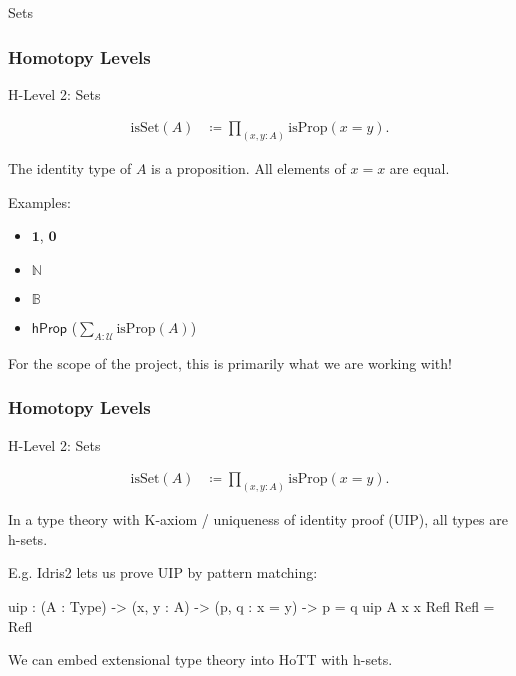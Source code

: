 \documentclass[9pt]{beamer}
\begin{document}
\begin{frame}{Sets}
\frametitle{Homotopy Levels}

H-Level 2: Sets

\begin{align*}
  \text{isSet}(A) & \coloneqq \prod_{(x,y:A)} \text{isProp}(x = y).
\end{align*}

The identity type of $A$ is a proposition.
All elements of $x = x$ are equal.

Examples:
\begin{itemize}
  \item $\mathbf{1}$, $\mathbf{0}$
  \item $\mathbb{N}$
  \item $\mathbb{B}$
  \item $\mathsf{hProp}$ ($\sum_{A : \mathcal{U}} \text{isProp}(A)$)
\end{itemize}

For the scope of the project, this is primarily what we are working with!

\end{frame}

\begin{frame}[fragile]
\frametitle{Homotopy Levels}

H-Level 2: Sets

\begin{align*}
  \text{isSet}(A) & \coloneqq \prod_{(x,y:A)} \text{isProp}(x = y).
\end{align*}

In a type theory with \alert{K-axiom} / \alert{uniqueness of identity proof} (UIP), all types
are h-sets.

E.g. Idris2 lets us prove UIP by pattern matching:

    \begin{dblock}[UIP]
        \begin{code}
uip : (A : Type) -> (x, y : A) -> (p, q : x = y) -> p = q
uip A x x Refl Refl = Refl
        \end{code}
    \end{dblock}

We can embed extensional type theory into HoTT with h-sets.

\end{frame}
\end{document}
